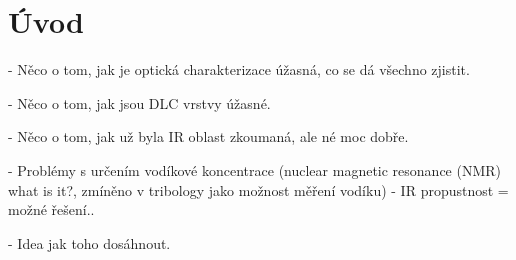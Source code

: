 \chapter*{Úvod}

- Něco o tom, jak je optická charakterizace úžasná, co se dá všechno zjistit.

- Něco o tom, jak jsou DLC vrstvy úžasné.

- Něco o tom, jak už byla IR oblast zkoumaná, ale né moc dobře.

- Problémy s určením vodíkové koncentrace (nuclear magnetic resonance (NMR) what is it?, zmíněno v tribology jako možnost měření vodíku) - IR propustnost = možné řešení..

- Idea jak toho dosáhnout.

\cleardoublepage

